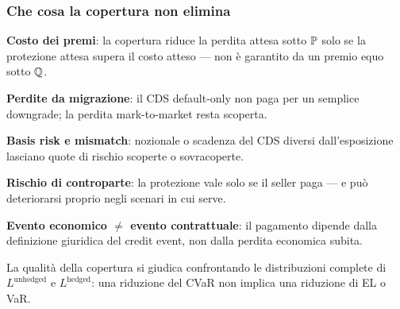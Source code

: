 \begin{frame}%
%

\frametitle{Che cosa la copertura non elimina}%
%

%


\begin{stepitemize}
\item \textbf{Costo dei premi}: la copertura riduce la perdita attesa sotto
$\mathbb{P}$ solo se la protezione attesa supera il costo atteso --- non \`{e}
garantito da un premio equo sotto $\mathbb{Q}$.

\item \textbf{Perdite da migrazione}: il CDS default-only non paga per un
semplice downgrade; la perdita mark-to-market resta scoperta.

\item \textbf{Basis risk e mismatch}: nozionale o scadenza del CDS diversi
dall'esposizione lasciano quote di rischio scoperte o sovracoperte.

\item \textbf{Rischio di controparte}: la protezione vale solo se il seller
paga --- e pu\`{o} deteriorarsi proprio negli scenari in cui serve.

\item \textbf{Evento economico $\neq$ evento contrattuale}: il pagamento
dipende dalla definizione giuridica del credit event, non dalla perdita
economica subita.
\end{stepitemize}

\medskip

\begin{center}
{\small La qualit\`{a} della copertura si giudica confrontando le
distribuzioni complete di $L^{\mathrm{unhedged}}$ e $L^{\mathrm{hedged}}$: una
riduzione del CVaR non implica una riduzione di EL o VaR.}
\end{center}

%

\transboxout
\end{frame}%


